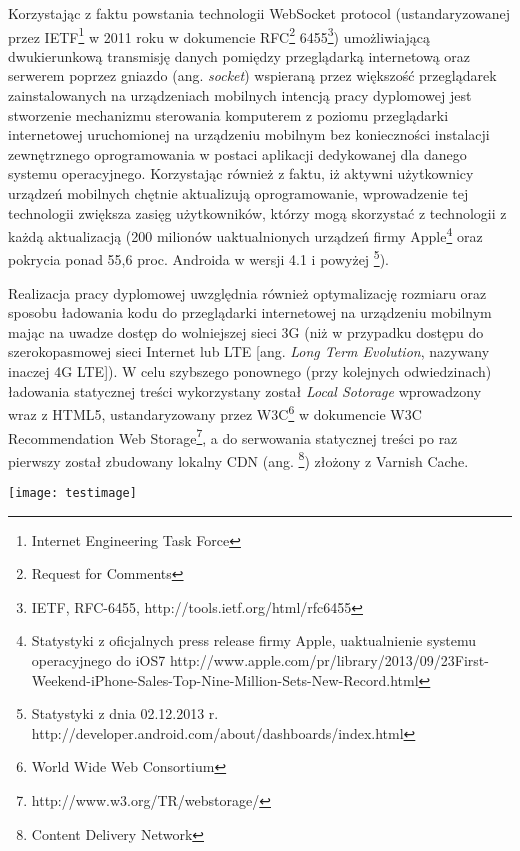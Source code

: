 Korzystając z faktu powstania technologii WebSocket protocol (ustandaryzowanej przez IETF\footnote{Internet Engineering Task Force} w 2011 roku w dokumencie RFC\footnote{Request for Comments} 6455\footnote{IETF, RFC-6455, http://tools.ietf.org/html/rfc6455}) umożliwiającą dwukierunkową transmisję danych pomiędzy przeglądarką internetową oraz serwerem poprzez gniazdo (ang. \emph{socket}) wspieraną przez większość przeglądarek zainstalowanych na urządzeniach mobilnych intencją pracy dyplomowej jest stworzenie mechanizmu sterowania komputerem z poziomu przeglądarki internetowej uruchomionej na urządzeniu mobilnym bez konieczności instalacji zewnętrznego oprogramowania w postaci aplikacji dedykowanej dla danego systemu operacyjnego. Korzystając również z faktu, iż aktywni użytkownicy urządzeń mobilnych chętnie aktualizują oprogramowanie, wprowadzenie tej technologii zwiększa zasięg użytkowników, którzy mogą skorzystać z technologii z każdą aktualizacją (200 milionów uaktualnionych urządzeń firmy Apple\footnote{Statystyki z oficjalnych press release firmy Apple, uaktualnienie systemu operacyjnego do iOS7 http://www.apple.com/pr/library/2013/09/23First-Weekend-iPhone-Sales-Top-Nine-Million-Sets-New-Record.html} oraz pokrycia ponad 55,6 proc. Androida w wersji 4.1 i powyżej \footnote{Statystyki z dnia 02.12.2013 r. http://developer.android.com/about/dashboards/index.html}).

Realizacja pracy dyplomowej uwzględnia również optymalizację rozmiaru oraz sposobu ładowania kodu do przeglądarki internetowej na urządzeniu mobilnym mając na uwadze dostęp do wolniejszej sieci 3G (niż w przypadku dostępu do szerokopasmowej sieci Internet lub LTE [ang. \emph{ Long Term Evolution}, nazywany inaczej 4G LTE]). W celu szybszego ponownego (przy kolejnych odwiedzinach) ładowania statycznej treści wykorzystany został \emph{Local Sotorage} wprowadzony wraz z HTML5, ustandaryzowany przez W3C\footnote{World Wide Web Consortium} w dokumencie W3C Recommendation Web Storage\footnote{http://www.w3.org/TR/webstorage/}, a do serwowania statycznej treści po raz pierwszy został zbudowany lokalny CDN (ang. \footnote{Content Delivery Network}) złożony z Varnish Cache.

\texttt{[image: testimage]}
